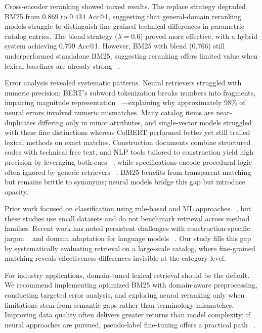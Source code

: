 \documentclass[preprint,12pt]{elsarticle}
\begin{document}
Cross-encoder reranking showed mixed results. The replace strategy degraded BM25 from $0.869$ to $0.434$ Acc@1, suggesting that general-domain reranking models struggle to distinguish fine-grained technical differences in parametric catalog entries. The blend strategy ($\lambda=0.6$) proved more effective, with a hybrid system achieving 0.799 Acc@1. However, BM25 with blend (0.766) still underperformed standalone BM25, suggesting reranking offers limited value when lexical baselines are already strong ~\cite{nogueiraDocumentRankingPretrained2020, zhuang2023rankt5}.

Error analysis revealed systematic patterns. Neural retrievers struggled with numeric precision: BERT's subword tokenization breaks numbers into fragments, impairing magnitude representation ~\cite{wallace2019nlp}—explaining why approximately 98\% of neural errors involved numeric mismatches. Many catalog items are near-duplicates differing only in minor attributes, and single-vector models struggled with these fine distinctions whereas ColBERT performed better yet still trailed lexical methods on exact matches. Construction documents combine structured codes with technical free text, and NLP tools tailored to construction yield high precision by leveraging both cues ~\cite{AKANBI2021}, while specifications encode procedural logic often ignored by generic retrievers ~\cite{LI2023}. BM25 benefits from transparent matching but remains brittle to synonyms; neural models bridge this gap but introduce opacity.

Prior work focused on classification using rule-based and ML approaches ~\cite{caldasAutomatingHierarchicalDocument2003, natural_wu_2022, martinez-rojasApproachAutomaticClassification2015, role_martnezrojas_2016, martinez-rojasUsingClassificationTechniques2018}, but these studies use small datasets and do not benchmark retrieval across method families. Recent work has noted persistent challenges with construction-specific jargon ~\cite{natural_wu_2022} and domain adaptation for language models ~\cite{chungComparingNaturalLanguage2023}. Our study fills this gap by systematically evaluating retrieval on a large-scale catalog, where fine-grained matching reveals effectiveness differences invisible at the category level.

For industry applications, domain-tuned lexical retrieval should be the default. We recommend implementing optimized BM25 with domain-aware preprocessing, conducting targeted error analysis, and exploring neural reranking only when limitations stem from semantic gaps rather than terminology mismatches. Improving data quality often delivers greater returns than model complexity; if neural approaches are pursued, pseudo-label fine-tuning offers a practical path ~\cite{li2022domain}.
\end{document}
